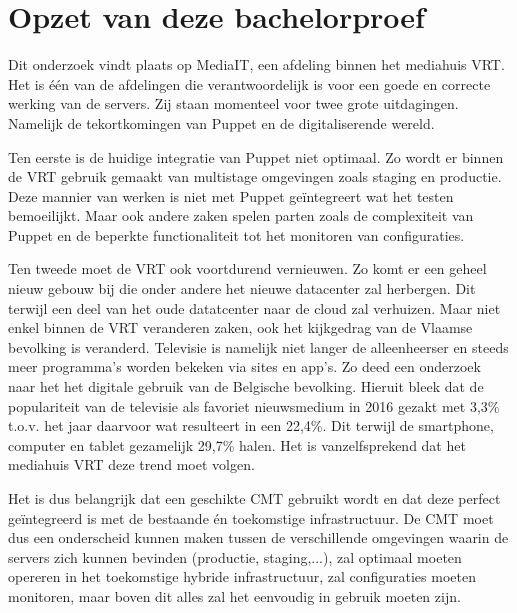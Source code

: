 \section{Opzet van deze bachelorproef}
\label{sec:opzet-bachelorproef}


Dit onderzoek vindt plaats op MediaIT, een afdeling binnen het mediahuis VRT. Het is \'e\'en van de afdelingen die verantwoordelijk is voor een goede en correcte werking van de servers. Zij staan momenteel voor twee grote uitdagingen. Namelijk de tekortkomingen van Puppet en de digitaliserende wereld.

Ten eerste is de huidige integratie van Puppet niet optimaal. Zo wordt er binnen de VRT gebruik gemaakt van multistage omgevingen zoals staging en productie. Deze mannier van werken is niet met Puppet ge\"integreert wat het testen bemoeilijkt. Maar ook andere zaken spelen parten zoals de complexiteit van Puppet en de beperkte functionaliteit tot het monitoren van configuraties.

Ten tweede moet de VRT ook voortdurend vernieuwen. Zo komt er een geheel nieuw gebouw bij die onder andere het nieuwe datacenter zal herbergen. Dit terwijl een deel van het oude datatcenter naar de cloud zal verhuizen. Maar niet enkel binnen de VRT veranderen zaken, ook het kijkgedrag van de Vlaamse bevolking is veranderd. Televisie is namelijk niet langer de alleenheerser en steeds meer programma's worden bekeken via sites en app's. Zo deed \textcite{digimeter} een onderzoek naar het het digitale gebruik van de Belgische bevolking. Hieruit bleek dat de populariteit van de televisie als favoriet nieuwsmedium  in 2016 gezakt met 3,3\% t.o.v. het jaar daarvoor wat resulteert in een 22,4\%. Dit terwijl de smartphone, computer en tablet gezamelijk 29,7\% halen. Het is vanzelfsprekend dat het mediahuis VRT deze trend moet volgen.

Het is dus belangrijk dat een geschikte \gls{CMT} gebruikt wordt en dat deze perfect ge\"integreerd is met de bestaande \'en toekomstige infrastructuur. De CMT moet dus een onderscheid kunnen maken tussen de verschillende omgevingen waarin de servers zich kunnen bevinden (productie, staging,...), zal optimaal moeten opereren in het toekomstige hybride infrastructuur, zal configuraties moeten monitoren, maar boven dit alles zal het eenvoudig in gebruik moeten zijn.\newline







